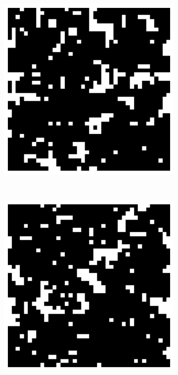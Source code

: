 \documentclass[11pt, a4paper]{report} %
\begin{document}
\begin{figure}[htb]
	\begin{subfigure}[c]{0.2\linewidth}
		\includegraphics[width=\linewidth]{20160603125614_40_by_40_Lattice_step40.pdf}
	\end{subfigure}
	~
	\begin{subfigure}[c]{0.2\linewidth}
		\includegraphics[width=\linewidth]{20160603125616_40_by_40_Lattice_step100.pdf}

\end{subfigure}
\end{figure}
\end{document}
